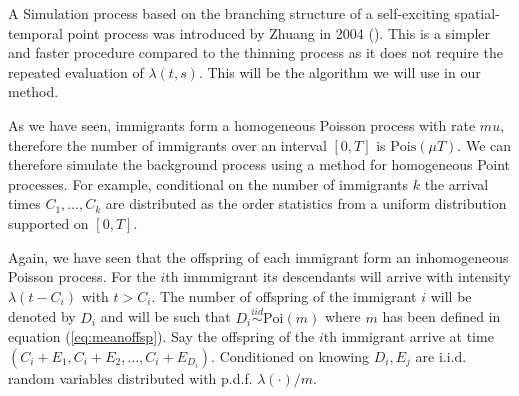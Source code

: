 A Simulation process based on the branching structure of a self-exciting spatial-temporal point process was introduced by Zhuang in 2004 (\cite{Zhuang}). This is a simpler and faster procedure compared to the thinning process as it does not require the repeated evaluation of $\lambda(t, s)$. This will be the algorithm we will use in our method.

As we have seen, immigrants form a homogeneous Poisson process with rate $mu$, therefore the number of immigrants over an interval $[0, T]$ is $\text{Pois}(\mu T)$. We can therefore simulate the background process using a method for homogeneous Point processes. For example, conditional on the number of immigrants $k$ the arrival times $C_1, \dots, C_k$ are distributed as the order statistics from a uniform distribution supported on $[0, T]$.

Again, we have seen that the offspring of each immigrant form an inhomogeneous Poisson process. For the $i$th immmigrant its descendants will arrive with intensity $\lambda(t-C_i)$ with $t > C_i$. The number of offspring of the immigrant $i$ will be denoted by $D_i$ and will be such that $D_i \overset{iid}{\sim}\text{Poi}(m)$ where $m$ has been defined in equation (\ref{eq:meanoffsp}). Say the offspring of the $i$th immigrant arrive at time $(C_i + E_1, C_i + E_2, \dots, C_i + E_{D_i})$. Conditioned on knowing $D_i, E_j$ are i.i.d. random variables distributed with p.d.f. $\lambda(\cdot)/m$.
